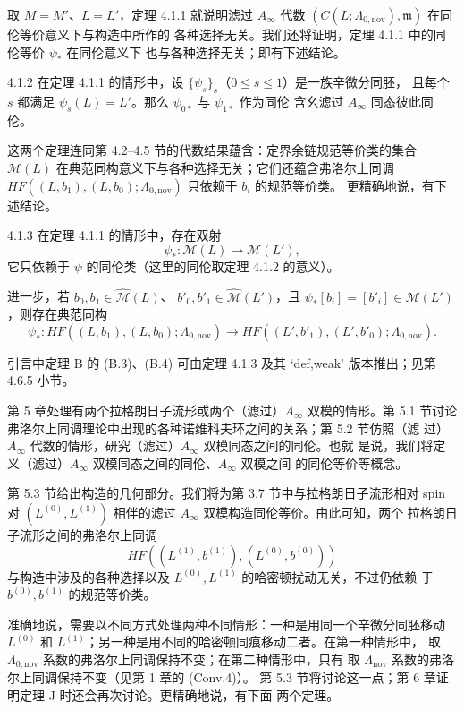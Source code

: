 取 $M=M'$、$L=L'$，定理 4.1.1 就说明滤过 $A_\infty$ 代数
$(C(L;\Lambda_{0,\mathrm{nov}}),\mathfrak m)$ 在同伦等价意义下与构造中所作的
各种选择无关。我们还将证明，定理 4.1.1 中的同伦等价 $\psi_*$ 在同伦意义下
也与各种选择无关；即有下述结论。

\begin{theorem}{4.1.2}\label{thm:4-1-2}
在定理 4.1.1 的情形中，设 $\{\psi_s\}_s$（$0\le s\le1$）是一族辛微分同胚，
且每个 $s$ 都满足 $\psi_s(L)=L'$。那么 $\psi_{0*}$ 与 $\psi_{1*}$ 作为同伦
含幺滤过 $A_\infty$ 同态彼此同伦。
\end{theorem}

这两个定理连同第 4.2--4.5 节的代数结果蕴含：定界余链规范等价类的集合
$\mathcal M(L)$ 在典范同构意义下与各种选择无关；它们还蕴含弗洛尔上同调
$HF((L,b_1),(L,b_0);\Lambda_{0,\mathrm{nov}})$ 只依赖于 $b_i$ 的规范等价类。
更精确地说，有下述结论。

\begin{theorem}{4.1.3}\label{thm:4-1-3}
在定理 4.1.1 的情形中，存在双射
\[
  \psi_*:\mathcal M(L)\longrightarrow\mathcal M(L'),
\]
它只依赖于 $\psi$ 的同伦类（这里的同伦取定理 4.1.2 的意义）。

进一步，若
$b_0,b_1\in\widehat{\mathcal M}(L)$、
$b'_0,b'_1\in\widehat{\mathcal M}(L')$，且
$\psi_*[b_i]=[b'_i]\in\mathcal M(L')$，则存在典范同构
\[
  \psi_*:
  HF((L,b_1),(L,b_0);\Lambda_{0,\mathrm{nov}})
  \longrightarrow
  HF((L',b'_1),(L',b'_0);\Lambda_{0,\mathrm{nov}}).
\]
\end{theorem}

引言中定理 B 的 (B.3)、(B.4) 可由定理 4.1.3 及其
`def,weak' 版本推出；见第 4.6.5 小节。

第 5 章处理有两个拉格朗日子流形或两个（滤过）$A_\infty$ 双模的情形。第 5.1
节讨论弗洛尔上同调理论中出现的各种诺维科夫环之间的关系；第 5.2 节仿照（滤
过）$A_\infty$ 代数的情形，研究（滤过）$A_\infty$ 双模同态之间的同伦。也就
是说，我们将定义（滤过）$A_\infty$ 双模同态之间的同伦、$A_\infty$ 双模之间
的同伦等价等概念。

第 5.3 节给出构造的几何部分。我们将为第 3.7 节中与拉格朗日子流形相对 spin
对 $(L^{(0)},L^{(1)})$ 相伴的滤过 $A_\infty$ 双模构造同伦等价。由此可知，两个
拉格朗日子流形之间的弗洛尔上同调
\[
  HF((L^{(1)},b^{(1)}),(L^{(0)},b^{(0)}))
\]
与构造中涉及的各种选择以及 $L^{(0)},L^{(1)}$ 的哈密顿扰动无关，不过仍依赖
于 $b^{(0)},b^{(1)}$ 的规范等价类。

准确地说，需要以不同方式处理两种不同情形：一种是用同一个辛微分同胚移动
$L^{(0)}$ 和 $L^{(1)}$；另一种是用不同的哈密顿同痕移动二者。在第一种情形中，
取 $\Lambda_{0,\mathrm{nov}}$ 系数的弗洛尔上同调保持不变；在第二种情形中，只有
取 $\Lambda_{\mathrm{nov}}$ 系数的弗洛尔上同调保持不变（见第 1 章的 (Conv.4)）。
第 5.3 节将讨论这一点；第 6 章证明定理 J 时还会再次讨论。更精确地说，有下面
两个定理。

